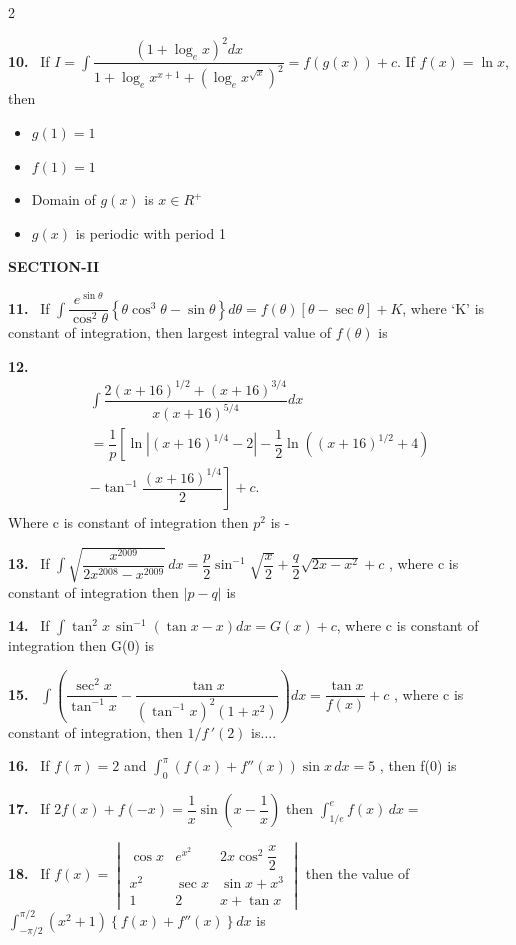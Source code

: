 \documentclass[10pt]{extarticle}
\newcommand{\sect}[1]{\par\smallskip\noindent\textbf{#1}\par}
\newcommand{\qn}[1]{\par\smallskip\noindent\textbf{#1.}~}
\newenvironment{qoptions}{\begin{itemize}[leftmargin=1.8em,itemsep=1pt,topsep=2pt,label={}]}{\end{itemize}}
\newcommand{\opt}[2]{\item[(#1)] #2}
\begin{document}
\begin{multicols}{2}
\qn{10} If $I=\displaystyle\int\dfrac{\left(1+\log_ex\right)^2dx}{1+\log_ex^{x+1}+\left(\log_ex^{\sqrt x}\right)^2}=f\left(g(x)\right)+c$. If $f(x)=\ln x$, then
\begin{qoptions}
\opt{A}{$g(1)=1$}
\opt{B}{$f(1)=1$}
\opt{C}{Domain of $g(x)$ is $x\in R^+$}
\opt{D}{$g(x)$ is periodic with period 1}
\end{qoptions}
\sect{SECTION-II}
\qn{11} If $\displaystyle\int\dfrac{e^{\sin\theta}}{\cos^2\theta}\left\{\theta\cos^3\theta-\sin\theta\right\}d\theta=f(\theta)\left[\theta-\sec\theta\right]+K$, where `K' is constant of integration, then largest integral value of $f(\theta)$ is \underline{\hspace{1cm}}
\qn{12} {\small\[\begin{gathered}\int\dfrac{2(x+16)^{1/2}+(x+16)^{3/4}}{x(x+16)^{5/4}}dx\\=\dfrac1p\left[\ln\left|(x+16)^{1/4}-2\right|-\dfrac12\ln\left((x+16)^{1/2}+4\right)\right.\\\left.-\tan^{-1}\dfrac{(x+16)^{1/4}}{2}\right]+c.\end{gathered}\]}
Where c is constant of integration then $p^2$ is -
\qn{13} If $\displaystyle\int\sqrt{\dfrac{x^{2009}}{2x^{2008}-x^{2009}}}\,dx=\dfrac p2\sin^{-1}\sqrt{\dfrac x2}+\dfrac q2\sqrt{2x-x^2}+c$ , where c is constant of integration then $|p-q|$ is
\qn{14} If $\displaystyle\int\tan^2x\,\sin^{-1}\left(\tan x-x\right)dx=G(x)+c$, where c is constant of integration then G(0) is
\qn{15} $\displaystyle\int\left(\dfrac{\sec^2x}{\tan^{-1}x}-\dfrac{\tan x}{\left(\tan^{-1}x\right)^2\left(1+x^2\right)}\right)dx=\dfrac{\tan x}{f(x)}+c$ , where c is constant of integration, then $1/f\,'(2)$ is....
\qn{16} If $f(\pi)=2$ and $\displaystyle\int_0^\pi\left(f(x)+f''(x)\right)\sin x\,dx=5$ , then f(0) is
\qn{17} If $2f(x)+f(-x)=\dfrac1x\sin\left(x-\dfrac1x\right)$ then $\displaystyle\int_{1/e}^{e}f(x)\,dx=$ \underline{\hspace{1cm}}
\qn{18} If $f(x)=\begin{vmatrix}\cos x&e^{x^2}&2x\cos^2\dfrac x2\\x^2&\sec x&\sin x+x^3\\1&2&x+\tan x\end{vmatrix}$ then the value of $\displaystyle\int_{-\pi/2}^{\pi/2}\left(x^2+1\right)\left\{f(x)+f''(x)\right\}dx$ is \underline{\hspace{1cm}}
\end{multicols}
\end{document}

